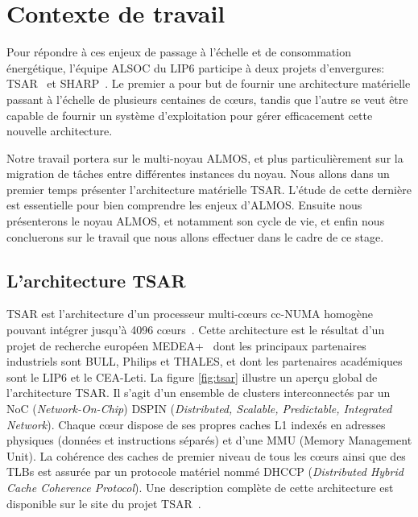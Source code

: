 \chapter{Contexte de travail}
\label{sec:context}

  Pour répondre à ces enjeux de passage à l'échelle et de consommation
  énergétique, l'équipe ALSOC du LIP6 participe à deux projets d'envergures:
  TSAR~\cite{tsar2008} et SHARP~\cite{sharp2012}. Le premier a pour but de
  fournir une architecture matérielle passant à l'échelle de plusieurs centaines
  de c\oe urs, tandis que l'autre se veut être capable de fournir un système
  d'exploitation pour gérer efficacement cette nouvelle architecture.

  Notre travail portera sur le multi-noyau ALMOS, et plus particulièrement sur
  la migration de tâches entre différentes instances du noyau. Nous allons dans
  un premier temps présenter l'architecture matérielle TSAR. L'étude de cette
  dernière est essentielle pour bien comprendre les enjeux d'ALMOS. Ensuite nous
  présenterons le noyau ALMOS, et notamment son cycle de vie, et enfin nous
  concluerons sur le travail que nous allons effectuer dans le cadre de ce
  stage.
  

  \section{L'architecture TSAR}
  \label{sec:tsar}

    TSAR est l'architecture d’un processeur multi-c\oe urs cc-NUMA homogène
    pouvant intégrer jusqu’à 4096 c\oe urs~\cite{greiner2009tsar}. Cette
    architecture est le résultat d’un projet de recherche européen
    MEDEA+~\cite{tsar2008} dont les principaux partenaires industriels sont
    BULL, Philips et THALES, et dont les partenaires académiques sont le LIP6 et
    le CEA-Leti. La figure \ref{fig:tsar} illustre un aperçu global de
    l'architecture TSAR. Il s'agit d'un ensemble de clusters interconnectés par
    un NoC (\textit{Network-On-Chip}) DSPIN (\textit{Distributed, Scalable,
      Predictable, Integrated Network}). Chaque c\oe ur dispose de ses propres
    caches L1 indexés en adresses physiques (données et instructions séparés) et
    d'une MMU (Memory Management Unit). La cohérence des caches de premier
    niveau de tous les c\oe urs ainsi que des TLBs est assurée par un protocole
    matériel nommé DHCCP (\textit{Distributed Hybrid Cache Coherence
      Protocol}). Une description complète de cette architecture est disponible
    sur le site du projet TSAR~\cite{tsar2008web}.

